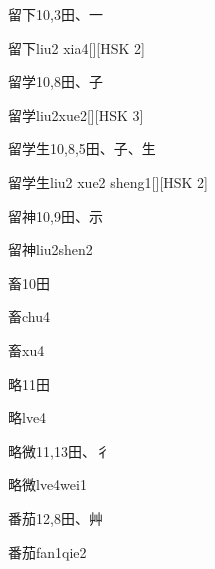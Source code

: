 \begin{entry}{留下}{10,3}{⽥、⼀}
  \begin{phonetics}{留下}{liu2 xia4}[][HSK 2]
  \end{phonetics}
\end{entry}

\begin{entry}{留学}{10,8}{⽥、⼦}
  \begin{phonetics}{留学}{liu2xue2}[][HSK 3]
  \end{phonetics}
\end{entry}

\begin{entry}{留学生}{10,8,5}{⽥、⼦、⽣}
  \begin{phonetics}{留学生}{liu2 xue2 sheng1}[][HSK 2]
  \end{phonetics}
\end{entry}

\begin{entry}{留神}{10,9}{⽥、⽰}
  \begin{phonetics}{留神}{liu2shen2}
  \end{phonetics}
\end{entry}

\begin{entry}{畜}{10}{⽥}
  \begin{phonetics}{畜}{chu4}
  \end{phonetics}
  \begin{phonetics}{畜}{xu4}
  \end{phonetics}
\end{entry}

\begin{entry}{略}{11}{⽥}
  \begin{phonetics}{略}{lve4}
  \end{phonetics}
\end{entry}

\begin{entry}{略微}{11,13}{⽥、⼻}
  \begin{phonetics}{略微}{lve4wei1}
  \end{phonetics}
\end{entry}

\begin{entry}{番茄}{12,8}{⽥、⾋}
  \begin{phonetics}{番茄}{fan1qie2}
  \end{phonetics}
\end{entry}


